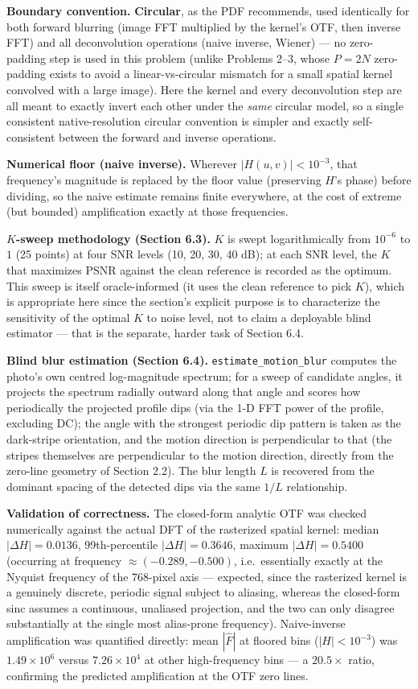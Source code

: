 \documentclass[11pt]{article}
\begin{document}
\textbf{Boundary convention.} \textbf{Circular}, as the PDF recommends, used identically for
both forward blurring (image FFT multiplied by the kernel's OTF, then inverse FFT) and all
deconvolution operations (naive inverse, Wiener) — no zero-padding step is used in this problem
(unlike Problems 2--3, whose $P=2N$ zero-padding exists to avoid a linear-vs-circular mismatch
for a small spatial kernel convolved with a large image). Here the kernel and every
deconvolution step are all meant to exactly invert each other under the \emph{same} circular
model, so a single consistent native-resolution circular convention is simpler and exactly
self-consistent between the forward and inverse operations.

\textbf{Numerical floor (naive inverse).} Wherever $|H(u,v)| < 10^{-3}$, that frequency's
magnitude is replaced by the floor value (preserving $H$'s phase) before dividing, so the naive
estimate remains finite everywhere, at the cost of extreme (but bounded) amplification exactly
at those frequencies.

\textbf{$K$-sweep methodology (Section 6.3).} $K$ is swept logarithmically from $10^{-6}$ to
$1$ (25 points) at four SNR levels (10, 20, 30, 40 dB); at each SNR level, the $K$ that maximizes
PSNR against the clean reference is recorded as the optimum. This sweep is itself
oracle-informed (it uses the clean reference to pick $K$), which is appropriate here since the
section's explicit purpose is to characterize the sensitivity of the optimal $K$ to noise level,
not to claim a deployable blind estimator — that is the separate, harder task of Section 6.4.

\textbf{Blind blur estimation (Section 6.4).} \texttt{estimate\_motion\_blur} computes the
photo's own centred log-magnitude spectrum; for a sweep of candidate angles, it projects the
spectrum radially outward along that angle and scores how periodically the projected profile
dips (via the 1-D FFT power of the profile, excluding DC); the angle with the strongest periodic
dip pattern is taken as the dark-stripe orientation, and the motion direction is perpendicular to
that (the stripes themselves are perpendicular to the motion direction, directly from the
zero-line geometry of Section 2.2). The blur length $L$ is recovered from the dominant spacing
of the detected dips via the same $1/L$ relationship.

\textbf{Validation of correctness.} The closed-form analytic OTF was checked numerically against
the actual DFT of the rasterized spatial kernel: median $|\Delta H| = 0.0136$, 99th-percentile
$|\Delta H| = 0.3646$, maximum $|\Delta H| = 0.5400$ (occurring at frequency
$\approx(-0.289,-0.500)$, i.e.\ essentially exactly at the Nyquist frequency of the 768-pixel
axis — expected, since the rasterized kernel is a genuinely discrete, periodic signal subject to
aliasing, whereas the closed-form sinc assumes a continuous, unaliased projection, and the two
can only disagree substantially at the single most alias-prone frequency). Naive-inverse
amplification was quantified directly: mean $|\hat F|$ at floored bins ($|H|<10^{-3}$) was
$1.49\times10^6$ versus $7.26\times10^4$ at other high-frequency bins — a $20.5\times$ ratio,
confirming the predicted amplification at the OTF zero lines.
\end{document}
